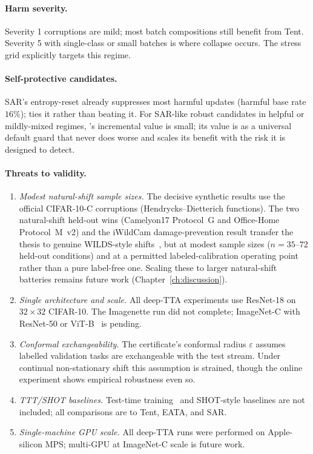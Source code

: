 \paragraph{Harm severity.}
Severity 1 corruptions are mild; most batch compositions still benefit from Tent.
Severity 5 with single-class or small batches is where collapse occurs.  The
stress grid explicitly targets this regime.

\paragraph{Self-protective candidates.}
SAR's entropy-reset already suppresses most harmful updates (harmful base rate $16\%$);
\KGA{} ties it rather than beating it.  For SAR-like robust candidates in helpful
or mildly-mixed regimes, \KGA{}'s incremental value is small; its value is as a
universal default guard that never does worse and scales its benefit with the risk it
is designed to detect.

\paragraph{Threats to validity.}
\begin{enumerate}
\item \emph{Modest natural-shift sample sizes.}  The decisive synthetic results use
  the official CIFAR-10-C corruptions (Hendrycks--Dietterich functions).  The two
  natural-shift held-out wins (Camelyon17 Protocol~G and Office-Home Protocol~M~v2)
  and the iWildCam damage-prevention result transfer the thesis to genuine WILDS-style
  shifts~\cite{koh2021wilds,venkateswara2017officehome}, but at modest sample sizes
  ($n{=}35$--$72$ held-out conditions) and at a permitted labeled-calibration operating
  point rather than a pure label-free one.  Scaling these to larger natural-shift
  batteries remains future work (Chapter~\ref{ch:discussion}).
\item \emph{Single architecture and scale.}  All deep-TTA experiments use
  ResNet-18 on $32{\times}32$ CIFAR-10.  The Imagenette run did not complete;
  ImageNet-C with ResNet-50 or ViT-B~\cite{dosovitskiy2021vit,he2016resnet} is pending.
\item \emph{Conformal exchangeability.}  The certificate's conformal radius
  $\varepsilon$ assumes labelled validation tasks are exchangeable with the test
  stream.  Under continual non-stationary shift this assumption is strained,
  though the online experiment shows empirical robustness even so.
\item \emph{TTT/SHOT baselines.}  Test-time training~\cite{wang2021tent} and
  SHOT-style baselines are not included; all comparisons are to Tent, EATA, and SAR.
\item \emph{Single-machine GPU scale.}  All deep-TTA runs were performed on
  Apple-silicon MPS; multi-GPU at ImageNet-C scale is future work.
\end{enumerate}
